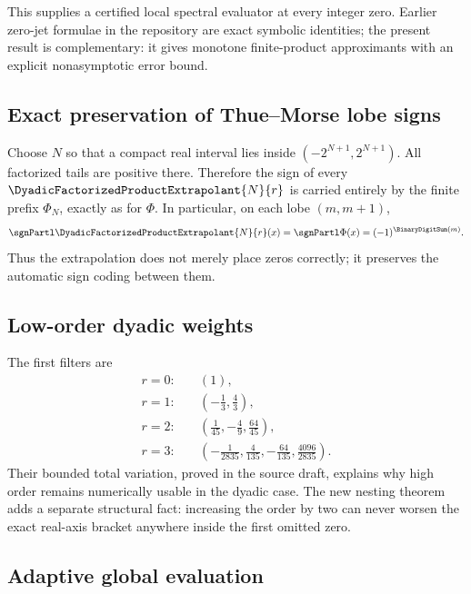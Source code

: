\documentclass[11pt]{article}
\numberwithin{equation}{section}
\theoremstyle{definition}
\theoremstyle{remark}
\begin{document}
This supplies a certified local spectral evaluator at every integer zero.  Earlier zero-jet
formulae in the repository are exact symbolic identities; the present result is complementary:
it gives monotone finite-product approximants with an explicit nonasymptotic error bound.

\subsection{Exact preservation of Thue--Morse lobe signs}

Choose $N$ so that a compact real interval lies inside $(-2^{N+1},2^{N+1})$.  All factorized
tails are positive there.  Therefore the sign of every $\DyadicFactorizedProductExtrapolant{N}{r}$ is carried
entirely by the finite prefix $\Phi_N$, exactly as for $\Phi$.  In particular, on each lobe
$(m,m+1)$,
\begin{equation}
 \sgnPartl\DyadicFactorizedProductExtrapolant{N}{r}(x)=\sgnPartl\Phi(x)=(-1)^{\BinaryDigitSum(m)}.
 \label{p3:eq:TM-sign-preserved}
\end{equation}
Thus the extrapolation does not merely place zeros correctly; it preserves the automatic
sign coding between them.

\subsection{Low-order dyadic weights}

The first filters are
\begin{align*}
 r=0:&\quad (1),\\
 r=1:&\quad \left(-\frac13,\frac43\right),\\
 r=2:&\quad \left(\frac1{45},-\frac49,\frac{64}{45}\right),\\
 r=3:&\quad \left(-\frac1{2835},\frac4{135},-\frac{64}{135},
                  \frac{4096}{2835}\right).
\end{align*}
Their bounded total variation, proved in the source draft, explains why high order remains
numerically usable in the dyadic case.  The new nesting theorem adds a separate structural
fact: increasing the order by two can never worsen the exact real-axis bracket anywhere
inside the first omitted zero.

\subsection{Adaptive global evaluation}
\end{document}
